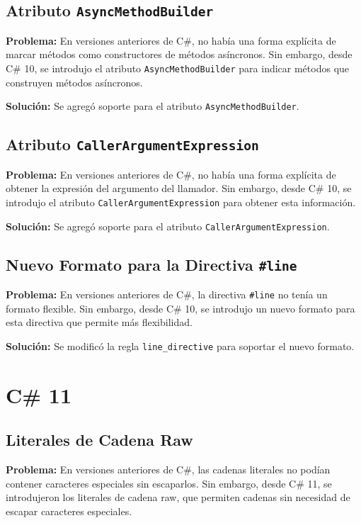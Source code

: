 \subsection{Atributo \texttt{AsyncMethodBuilder}}
\textbf{Problema:} En versiones anteriores de C\#, no había una forma explícita de marcar métodos como constructores de métodos asíncronos. Sin embargo, desde C\# 10, se introdujo el atributo \texttt{AsyncMethodBuilder} para indicar métodos que construyen métodos asíncronos.

\textbf{Solución:} Se agregó soporte para el atributo \texttt{AsyncMethodBuilder}.

\subsection{Atributo \texttt{CallerArgumentExpression}}
\textbf{Problema:} En versiones anteriores de C\#, no había una forma explícita de obtener la expresión del argumento del llamador. Sin embargo, desde C\# 10, se introdujo el atributo \texttt{CallerArgumentExpression} para obtener esta información.

\textbf{Solución:} Se agregó soporte para el atributo \texttt{CallerArgumentExpression}.

\subsection{Nuevo Formato para la Directiva \texttt{\#line}}
\textbf{Problema:} En versiones anteriores de C\#, la directiva \texttt{\#line} no tenía un formato flexible. Sin embargo, desde C\# 10, se introdujo un nuevo formato para esta directiva que permite más flexibilidad.

\textbf{Solución:} Se modificó la regla \texttt{line\_directive} para soportar el nuevo formato.


\section{C\# 11}

\subsection{Literales de Cadena Raw}

\textbf{Problema:} En versiones anteriores de C\#, las cadenas literales no podían contener caracteres especiales sin escaparlos. Sin embargo, desde C\# 11, se introdujeron los literales de cadena raw, que permiten cadenas sin necesidad de escapar caracteres especiales.

